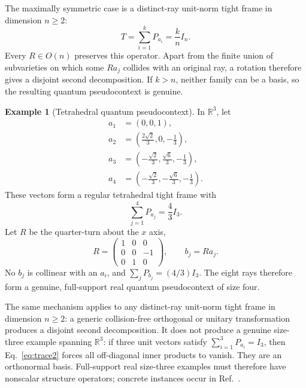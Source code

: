 \documentclass[
  twocolumn,
  aps,
  pra,
  floatfix,
  amsmath,amssymb,
  longbibliography
]{revtex4-2}
\theoremstyle{definition}
\newtheorem{example}[theorem]{Example}
\theoremstyle{remark}
\newcommand{\R}{\mathbb R}
\newcommand{\1}{\mathbf 1}
\begin{document}
The maximally symmetric case is a distinct-ray unit-norm tight frame in
dimension $n\ge2$:
\begin{equation}
 T=\sum_{i=1}^{k}P_{a_i}=\frac{k}{n}I_n.
 \label{eq:tight-frame}
\end{equation}
Every $R\in O(n)$ preserves this operator.  Apart from the finite union of
subvarieties on which some $Ra_j$ collides with an original ray, a rotation
therefore gives a disjoint second decomposition.  If $k>n$, neither family can
be a basis, so the resulting quantum pseudocontext is genuine.

\begin{example}[Tetrahedral quantum pseudocontext]
\label{ex:tetrahedron}
In $\R^3$, let
\begin{align}
 a_1&=(0,0,1),\nonumber\\
 a_2&=\left(\frac{2\sqrt2}{3},0,-\frac13\right),\nonumber\\
 a_3&=\left(-\frac{\sqrt2}{3},\frac{\sqrt6}{3},-\frac13\right),
 \label{eq:tetrahedron}\\
 a_4&=\left(-\frac{\sqrt2}{3},-\frac{\sqrt6}{3},-\frac13\right).
 \nonumber
\end{align}
These vectors form a regular tetrahedral tight frame with
\begin{equation}
 \sum_{j=1}^{4}P_{a_j}=\frac43I_3.
 \label{eq:tetrahedron-tight}
\end{equation}
Let $R$ be the quarter-turn about the $x$ axis,
\begin{equation}
 R=\begin{pmatrix}1&0&0\\0&0&-1\\0&1&0\end{pmatrix},
 \qquad b_j=Ra_j.
 \label{eq:tetrahedron-rotation}
\end{equation}
No $b_j$ is collinear with an $a_i$, and
$\sum_jP_{b_j}=(4/3)I_3$.  The eight rays therefore form a genuine,
full-support real quantum pseudocontext of size four.
\end{example}

The same mechanism applies to any distinct-ray unit-norm tight frame in
dimension $n\ge2$: a generic collision-free orthogonal or unitary
transformation produces a disjoint second decomposition.  It does not produce
a genuine size-three example spanning
$\R^3$: if three unit vectors satisfy $\sum_{i=1}^3P_{a_i}=I_3$, then
Eq.~\eqref{eq:trace2} forces all off-diagonal inner products to vanish.  They
are an orthonormal basis.  Full-support real size-three examples must
therefore have nonscalar structure operators; concrete instances occur in
Ref.~\cite{2023-navara-svozil}.
\end{document}

